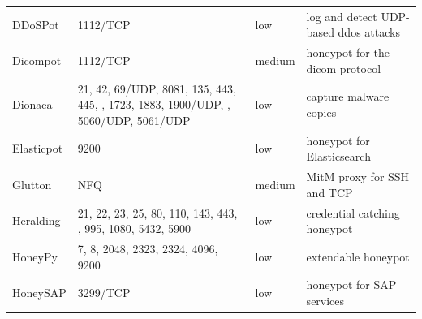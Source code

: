 \begin{table}
\begin{tabularx}{\linewidth}{l|XlX}
        DDoSPot \cite{ddosspot2021}               & 1112/TCP                                                                                                    & low                        & log and detect UDP-based \ac{ddos} attacks                                           \\
        Dicompot \cite{dicompot2021}              & 1112/TCP                                                                                                    & medium                     & honeypot for the \ac{dicom} protocol                                                 \\
        Dionaea \cite{dionaea2021}                & 21, 42, 69/UDP, 8081, 135, 443, 445, \newline 1433, 1723, 1883, 1900/UDP, \newline 3306, 5060/UDP, 5061/UDP & low                        & capture malware copies                                                               \\
        Elasticpot \cite{elasticpot2021}          & 9200                                                                                                        & low                        & honeypot for Elasticsearch                                                           \\
        Glutton \cite{glutton2021}                & NFQ                                                                                                         & medium                     & MitM proxy for SSH and TCP                                                           \\
        Heralding \cite{heralding2021}            & 21, 22, 23, 25, 80, 110, 143, 443, \newline 993, 995, 1080, 5432, 5900                                      & low                        & credential catching honeypot                                                         \\
        HoneyPy \cite{honeysap2021}               & 7, 8, 2048, 2323, 2324, 4096, 9200                                                                          & low                        & extendable honeypot                                                                  \\
        HoneySAP \cite{honeysap2021}              & 3299/TCP                                                                                                    & low                        & honeypot for SAP services                                                            \\

\end{tabularx}
\end{table}
